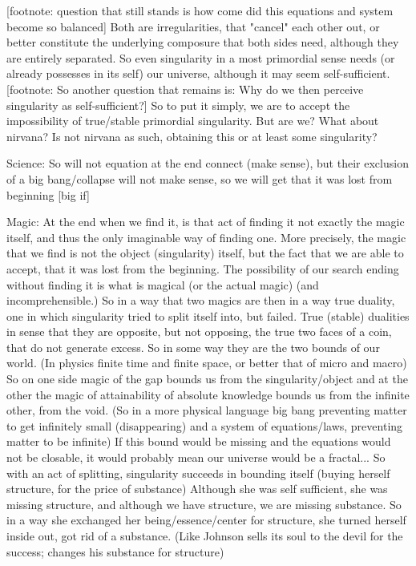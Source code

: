 \documentclass[10pt]{book}
\begin{document}
[footnote: question that still stands is how come did this equations and system become so balanced]
Both are irregularities, that "cancel" each other out, or better constitute the underlying composure that both sides need, although they are entirely separated.
So even singularity in a most primordial sense needs (or already possesses in its self) our universe, although it may seem self-sufficient. 
[footnote: So another question that remains is: Why do we then perceive singularity as self-sufficient?] So to put it simply, we are to accept the impossibility of true/stable primordial singularity. But are we? What about nirvana? Is not nirvana as such, obtaining this or at least some singularity?

Science:
So will not equation at the end connect (make sense), but their exclusion of a big bang/collapse will not make sense, so we will get that it was lost from beginning [big if]

Magic:
At the end when we find it, is that act of finding it not exactly the magic itself, and thus the only imaginable way of finding one. More precisely, the magic that we find is not the object (singularity) itself, but the fact that we are able to accept, that it was lost from the beginning. The possibility of our search ending without finding it is what is magical (or the actual magic) (and incomprehensible.)
So in a way that two magics are then in a way true duality, one in which singularity tried to split itself into, but failed. True (stable) dualities in sense that they are opposite, but not opposing, the true two faces of a coin, that do not generate excess. So in some way they are the two bounds of our world. (In physics finite time and finite space, or better that of micro and macro) So on one side magic of the gap bounds us from the singularity/object and at the other the magic of attainability of absolute knowledge bounds us from the infinite other, from the void. (So in a more physical language big bang preventing matter to get infinitely small (disappearing) and a system of equations/laws, preventing matter to be infinite) If this bound would be missing and the equations would not be closable, it would probably mean our universe would be a fractal...
So with an act of splitting, singularity succeeds in bounding itself (buying herself structure, for the price of substance) Although she was self sufficient, she was missing structure, and although we have structure, we are missing substance. So in a way she exchanged her being/essence/center for structure, she turned herself inside out, got rid of a substance. (Like Johnson sells its soul to the devil for the success; changes his substance for structure)
\end{document}

